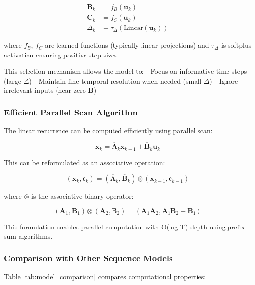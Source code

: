 \documentclass[10pt,journal,compsoc]{IEEEtran}
\begin{document}
\begin{align}
\mathbf{B}_k &= f_B(\mathbf{u}_k) \\
\mathbf{C}_k &= f_C(\mathbf{u}_k) \\
\Delta_k &= \tau_{\Delta}(\text{Linear}(\mathbf{u}_k))
\end{align}

where $f_B$, $f_C$ are learned functions (typically linear projections) and $\tau_{\Delta}$ is softplus activation ensuring positive step sizes.

This selection mechanism allows the model to:
- Focus on informative time steps (large $\Delta$)
- Maintain fine temporal resolution when needed (small $\Delta$)
- Ignore irrelevant inputs (near-zero $\mathbf{B}$)

\subsubsection{Efficient Parallel Scan Algorithm}

The linear recurrence can be computed efficiently using parallel scan:

\begin{equation}
\mathbf{x}_k = \overline{\mathbf{A}}_k \mathbf{x}_{k-1} + \overline{\mathbf{B}}_k \mathbf{u}_k
\end{equation}

This can be reformulated as an associative operation:

\begin{equation}
(\mathbf{x}_k, \mathbf{c}_k) = (\overline{\mathbf{A}}_k, \overline{\mathbf{B}}_k) \otimes (\mathbf{x}_{k-1}, \mathbf{c}_{k-1})
\end{equation}

where $\otimes$ is the associative binary operator:

\begin{equation}
(\mathbf{A}_1, \mathbf{B}_1) \otimes (\mathbf{A}_2, \mathbf{B}_2) = (\mathbf{A}_1 \mathbf{A}_2, \mathbf{A}_1 \mathbf{B}_2 + \mathbf{B}_1)
\end{equation}

This formulation enables parallel computation with O(log T) depth using prefix sum algorithms.

\subsubsection{Comparison with Other Sequence Models}

Table \ref{tab:model_comparison} compares computational properties:
\end{document}
